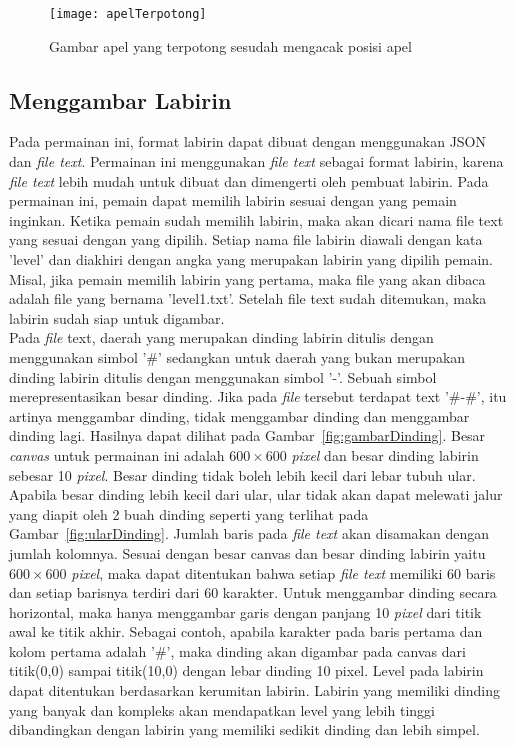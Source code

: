 \begin{figure}[H]
	\centering  
	\texttt{[image: apelTerpotong]}  
	\caption[Gambar apel yang terpotong sesudah mengacak posisi apel]{Gambar apel yang terpotong sesudah mengacak posisi apel}
	\label{fig:apelTerpotong} 
\end{figure}

\subsection{Menggambar Labirin}
Pada permainan ini, format labirin dapat dibuat dengan menggunakan JSON dan \textit{file text}. Permainan ini menggunakan \textit{file text} sebagai format labirin, karena \textit{file text} lebih mudah untuk dibuat dan dimengerti oleh pembuat labirin. Pada permainan ini, pemain dapat memilih labirin sesuai dengan yang pemain inginkan. Ketika pemain sudah memilih labirin, maka akan dicari nama file text yang sesuai dengan yang dipilih. Setiap nama file labirin diawali dengan kata 'level' dan diakhiri dengan angka yang merupakan labirin yang dipilih pemain. Misal, jika pemain memilih labirin yang pertama, maka file yang akan dibaca adalah file yang bernama 'level1.txt'. Setelah file text sudah ditemukan, maka labirin sudah siap untuk digambar. \\

Pada \textit{file} text, daerah yang merupakan dinding labirin ditulis dengan menggunakan simbol '\#' sedangkan untuk daerah yang bukan merupakan dinding labirin ditulis dengan menggunakan simbol '-'. Sebuah simbol merepresentasikan besar dinding. Jika pada \textit{file} tersebut terdapat text '\#-\#', itu artinya menggambar dinding, tidak menggambar dinding dan menggambar dinding lagi. Hasilnya dapat dilihat pada Gambar~\ref{fig:gambarDinding}. Besar \textit{canvas} untuk permainan ini adalah $600 \times 600$ \textit{pixel} dan besar dinding labirin sebesar 10 \textit{pixel}. Besar dinding tidak boleh lebih kecil dari lebar tubuh ular. Apabila besar dinding lebih kecil dari ular, ular tidak akan dapat melewati jalur yang diapit oleh 2 buah dinding seperti yang terlihat pada Gambar~\ref{fig:ularDinding}. Jumlah baris pada \textit{file text} akan disamakan dengan jumlah kolomnya. Sesuai dengan besar canvas dan besar dinding labirin yaitu $600 \times 600$ \textit{pixel}, maka dapat ditentukan bahwa setiap \textit{file text} memiliki 60 baris dan setiap barisnya terdiri dari 60 karakter. Untuk menggambar dinding secara horizontal, maka hanya menggambar garis dengan panjang 10 \textit{pixel} dari titik awal ke titik akhir. Sebagai contoh, apabila karakter pada baris pertama dan kolom pertama adalah '\#', maka dinding akan digambar pada canvas dari titik(0,0) sampai titik(10,0) dengan lebar dinding 10 pixel. Level pada labirin dapat ditentukan berdasarkan kerumitan labirin. Labirin yang memiliki dinding yang banyak dan kompleks akan mendapatkan level yang lebih tinggi dibandingkan dengan labirin yang memiliki sedikit dinding dan lebih simpel. \\

